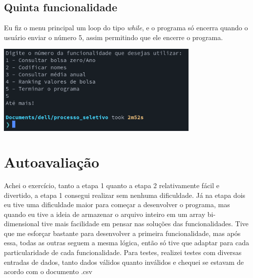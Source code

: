 \documentclass[11pt]{article}
\begin{document}
\subsection{Quinta funcionalidade}
\label{sec:orgf4eaff4}
Eu fiz o menu principal um loop do tipo \emph{while}, e o programa só encerra quando o usuário enviar o número 5, assim permitindo que ele encerre o programa.

\includegraphics[width=10cm]{func5.png}

\section{Autoavaliação}
\label{sec:org65b4597}

Achei o exercício, tanto a etapa 1 quanto a etapa 2 relativamente fácil e divertido, a etapa 1 consegui realizar sem nenhuma dificuldade. Já na etapa dois eu tive uma dificuldade maior para começar a desenvolver o programa, mas quando eu tive a ideia de armazenar o arquivo inteiro em um array bi-dimensional tive mais facilidade em pensar nas soluções das funcionalidades. Tive que me esforçar bastante para desenvolver a primeira funcionalidade, mas após essa, todas as outras seguem a mesma lógica, então só tive que adaptar para cada particularidade de cada funcionalidade. Para testes, realizei testes com diversas entradas de dados, tanto dados válidos quanto inválidos e chequei se estavam de acordo com o documento .csv
\end{document}
